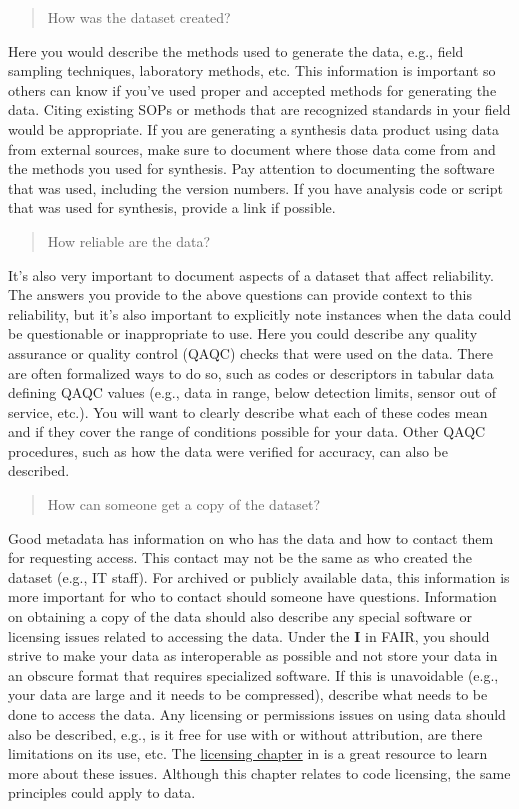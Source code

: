 \documentclass[
]{book}
\begin{document}
\begin{quote}
How was the dataset created?
\end{quote}

Here you would describe the methods used to generate the data, e.g., field sampling techniques, laboratory methods, etc. This information is important so others can know if you've used proper and accepted methods for generating the data. Citing existing SOPs or methods that are recognized standards in your field would be appropriate. If you are generating a synthesis data product using data from external sources, make sure to document where those data come from and the methods you used for synthesis. Pay attention to documenting the software that was used, including the version numbers. If you have analysis code or script that was used for synthesis, provide a link if possible.

\begin{quote}
How reliable are the data?
\end{quote}

It's also very important to document aspects of a dataset that affect reliability. The answers you provide to the above questions can provide context to this reliability, but it's also important to explicitly note instances when the data could be questionable or inappropriate to use. Here you could describe any quality assurance or quality control (QAQC) checks that were used on the data. There are often formalized ways to do so, such as codes or descriptors in tabular data defining QAQC values (e.g., data in range, below detection limits, sensor out of service, etc.). You will want to clearly describe what each of these codes mean and if they cover the range of conditions possible for your data. Other QAQC procedures, such as how the data were verified for accuracy, can also be described.

\begin{quote}
How can someone get a copy of the dataset?
\end{quote}

Good metadata has information on who has the data and how to contact them for requesting access. This contact may not be the same as who created the dataset (e.g., IT staff). For archived or publicly available data, this information is more important for who to contact should someone have questions. Information on obtaining a copy of the data should also describe any special software or licensing issues related to accessing the data. Under the \textbf{I} in FAIR, you should strive to make your data as interoperable as possible and not store your data in an obscure format that requires specialized software. If this is unavoidable (e.g., your data are large and it needs to be compressed), describe what needs to be done to access the data. Any licensing or permissions issues on using data should also be described, e.g., is it free for use with or without attribution, are there limitations on its use, etc. The \href{https://r-pkgs.org/license.html}{licensing chapter} in \citet{Wickham15} is a great resource to learn more about these issues. Although this chapter relates to code licensing, the same principles could apply to data.
\end{document}
